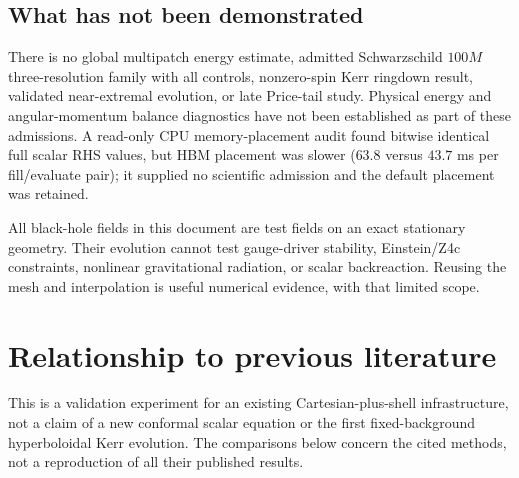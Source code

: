 \documentclass[11pt,letterpaper]{article}
\begin{document}
\subsection{What has not been demonstrated}
There is no global multipatch energy estimate, admitted Schwarzschild $100M$ three-resolution family with all controls, nonzero-spin Kerr ringdown result, validated near-extremal evolution, or late Price-tail study. Physical energy and angular-momentum balance diagnostics have not been established as part of these admissions. A read-only CPU memory-placement audit found bitwise identical full scalar RHS values, but HBM placement was slower ($63.8$ versus $43.7$ ms per fill/evaluate pair); it supplied no scientific admission and the default placement was retained.

All black-hole fields in this document are test fields on an exact stationary geometry. Their evolution cannot test gauge-driver stability, Einstein/Z4c constraints, nonlinear gravitational radiation, or scalar backreaction. Reusing the mesh and interpolation is useful numerical evidence, with that limited scope.

\clearpage
\section{Relationship to previous literature}
This is a validation experiment for an existing Cartesian-plus-shell infrastructure, not a claim of a new conformal scalar equation or the first fixed-background hyperboloidal Kerr evolution. The comparisons below concern the cited methods, not a reproduction of all their published results.
\end{document}

